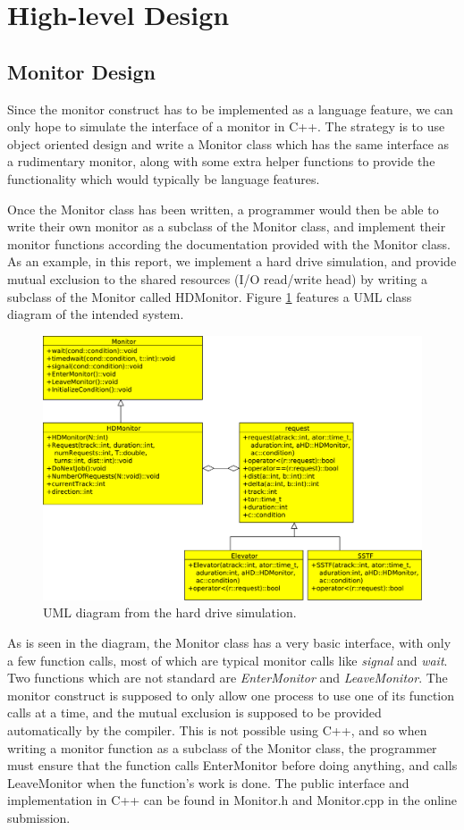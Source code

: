 \documentclass{report}
\begin{document}
\section{High-level Design} %
\subsection{Monitor Design}
Since the monitor construct has to be implemented as a language feature, we can only hope to
simulate the interface of a monitor in C++. The strategy is to use object oriented design
and write a Monitor class which has the same interface as a rudimentary monitor, along
with some extra helper functions to provide the functionality which would typically be
language features. 

Once the Monitor class has been written, a programmer would then be able to write their
own monitor as a subclass of the Monitor class, and implement their monitor functions
according the documentation provided with the Monitor class. As an example, in this
report, we implement a hard drive simulation, and provide mutual exclusion to the shared
resources (I/O read/write head) by writing a subclass of the Monitor called HDMonitor.
Figure \ref{fig:UML} features a UML class diagram of the intended system.
\begin{figure}[htb!]
    \centering
    \includegraphics[scale=0.5]{300UML.pdf}
    \caption{UML diagram from the hard drive simulation.}
    \label{fig:UML}
\end{figure}

As is seen in the diagram, the Monitor class has a very basic interface, with only a few
function calls, most of which are typical monitor calls like \emph{signal} and
\emph{wait}. Two functions which are not standard are \emph{EnterMonitor} and
\emph{LeaveMonitor}. The monitor construct is supposed to only allow one process to use
one of its function calls at a time, and the mutual exclusion is supposed to be provided
automatically by the compiler. This is not possible using C++, and so when writing a
monitor function as a subclass of the Monitor class, the programmer must ensure that the
function calls EnterMonitor before doing anything, and calls LeaveMonitor when the
function's work is done. The public interface and implementation in C++ can be found in Monitor.h and Monitor.cpp in the online submission.
\end{document}
